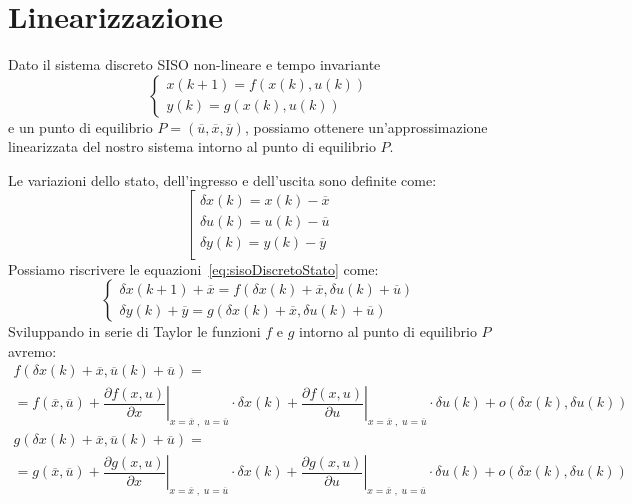 \documentclass[a4paper]{report}
\begin{document}
\section{Linearizzazione}
Dato il sistema discreto SISO non-lineare e tempo invariante
\begin{equation}\label{eq:sisoDiscretoStato}
  \left\{
  \begin{array}{l}
    x (k + 1) = f(x(k), u(k))\\
    y(k) = g(x(k), u(k))
  \end{array}
  \right.
\end{equation}
e un punto di equilibrio $P = (\overline{u}, \overline{x},
\overline{y})$, possiamo ottenere un'approssimazione linearizzata del
nostro sistema intorno al punto di equilibrio $P$.

Le variazioni dello stato, dell'ingresso e dell'uscita sono definite
come: 
\[
\left[
\begin{array}{l}
  \delta x(k) = x (k) - \overline{x}\\
  \delta u(k) = u (k) - \overline{u}\\
  \delta y(k) = y (k) - \overline{y}\\
\end{array}
\right.
\]
Possiamo riscrivere le equazioni~\ref{eq:sisoDiscretoStato} come:
\begin{equation}
  \left\{
  \begin{array}{l}
    \delta x (k + 1) + \overline{x} = f ( \delta x(k) + \overline{x},
    \delta u (k) + \overline{u})\\
    \delta y (k) + \overline{y} = g (\delta x (k) + \overline{x},
    \delta u(k) + \overline{u})
  \end{array}
  \right.
\end{equation}
Sviluppando in serie di Taylor le funzioni $f$ e $g$ intorno al punto
di equilibrio $P$ avremo:
\[
\begin{array}{l}
  f (\delta x (k) + \overline{x}, \overline{u}(k) + \overline{u}) =\\
  = f(\overline{x}, \overline{u}) + \left. \dfrac{\partial f(x,
   u)}{\partial x}\right|_{x = \overline{x} \;,\; u = \overline{u}}
 \cdot \delta x(k) +  \left.\dfrac{\partial f(x,
   u)}{\partial u}\right|_{x = \overline{x} \;,\; u = \overline{u}}
 \cdot \delta u(k) + o (\delta x(k), \delta u(k))\\
 
  g (\delta x (k) + \overline{x}, \overline{u}(k) + \overline{u}) =\\
  = g(\overline{x}, \overline{u}) + \left. \dfrac{\partial g(x,
   u)}{\partial x}\right|_{x = \overline{x} \;,\; u = \overline{u}}
 \cdot \delta x(k) + \left. \dfrac{\partial g(x,
   u)}{\partial u}\right|_{x = \overline{x} \;,\; u = \overline{u}}
 \cdot \delta u(k) + o (\delta x(k), \delta u(k))
\end{array}
\]
\end{document}
